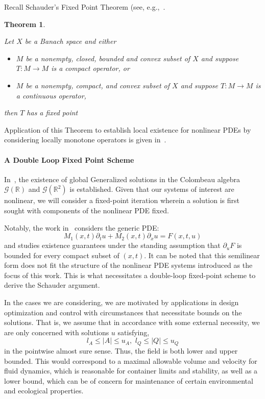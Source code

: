 \documentclass{article}
\newcommand{\1}{\mathds{1}}          %
\newtheorem{theorem}{Theorem}[section]
\theoremstyle{definition}
\newcommand{\R}{\mathbb{R}}
\begin{document}
\begin{sloppypar}
Recall Schauder's Fixed Point Theorem (see, e.g.,~\cite[Theorem 2.A and Corollary 2.13]{zeidler1986nonlinear}.

\begin{theorem}\label{th:shauder}

Let $X$ be a Banach space and either
\begin{itemize}
    \item  $M$ be a nonempty, closed, bounded and convex subset of $X$ and suppose $T:M\to M$ is a compact operator, or
    \item  $M$ be a nonempty, compact,  and convex subset of $X$ and suppose $T:M\to M$ is a continuous operator,
\end{itemize}
then $T$ has a fixed point 
\end{theorem}


Application of this Theorem to establish local existence for nonlinear PDEs by considering locally monotone operators is given in~\cite{liu2011existence}. 


\paragraph{A Double Loop Fixed Point Scheme}
In~\cite{Oberguggenberger1987}, the existence of global Generalized solutions in the Colombeau algebra $\mathcal{G}(\R)$ and $\mathcal{G}(\R^2)$ is established. Given that our systems of interest are nonlinear, we will consider a fixed-point iteration wherein a solution is first sought with components of the nonlinear PDE fixed. 

Notably, the work in~\cite{Oberguggenberger1987} considers the generic PDE:
\begin{equation}\label{eq:obersemilin}
M_1(x,t)\partial_t u+M_2(x,t) \partial_x u = F(x,t,u)
\end{equation}
and studies existence guarantees under the standing assumption that $\partial_u F$ is bounded for every compact subset of $(x,t)$. It can be noted that this semilinear form does not fit the structure of the nonlinear PDE systems introduced as the focus of this work. This is what necessitates a double-loop fixed-point scheme to derive the Schauder argument. 

In the cases we are considering, we are motivated by applications in design optimization and control with circumstances that necessitate bounds on the solutions. That is, we assume that in accordance with some external necessity, we are only concerned with solutions $u$ satisfying,
\begin{equation}\label{eq:solnbounds}
l_A \le \vert A\vert \le u_A,\,\,l_Q\le \vert Q\vert \le u_Q
\end{equation}
in the pointwise almost sure sense. Thus, the field is both lower and upper bounded. This would correspond to a maximal allowable volume and velocity for fluid dynamics, which is reasonable for container limits and stability, as well as a lower bound, which can be of concern for maintenance of certain environmental and ecological properties. 


\end{sloppypar}
\end{document}
